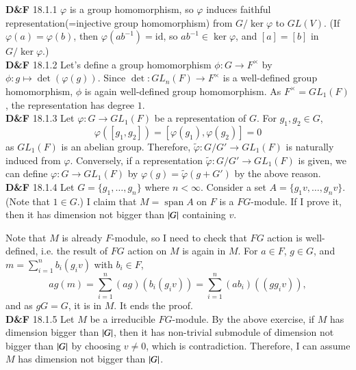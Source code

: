 \documentclass[a4paper, 12pt]{article}
\theoremstyle{Mydefinition}
\theoremstyle{Mytheorem}
\DeclareMathOperator{\spn}{span}
\begin{document}
\noindent \textbf{D\&F} 18.1.1
$\varphi$ is a group homomorphism, so $\varphi$ induces faithful representation(=injective group homomorphism) from $G/\ker\varphi$ to $GL(V)$. (If $\varphi(a)=\varphi(b)$, then $\varphi(ab^{-1}) = \mathrm{id}$, so $ab^{-1}\in \ker\varphi$, and $[a]=[b]$ in $G/\ker\varphi$.)\\

\noindent \textbf{D\&F} 18.1.2
Let's define a group homomorphism $\phi:G\rightarrow F^\times$ by $\phi:g\mapsto \det(\varphi(g))$. Since $\det:GL_n(F)\rightarrow F^\times$ is a well-defined group homomorphism, $\phi$ is again well-defined group homomorphism. As $F^\times = GL_1(F)$, the representation has degree $1$.\\

\noindent \textbf{D\&F} 18.1.3
Let $\varphi:G\rightarrow GL_1(F)$ be a representation of $G$. For $g_1,g_2\in G$,
\begin{equation}
    \varphi([g_1,g_2]) = [\varphi(g_1),\varphi(g_2)] = 0
\end{equation}
as $GL_1(F)$ is an abelian group. Therefore, $\tilde{\varphi}:G/G'\rightarrow GL_1(F)$ is naturally induced from $\varphi$. Conversely, if a representation $\tilde{\varphi}:G/G'\rightarrow GL_1(F)$ is given, we can define $\varphi:G\rightarrow GL_1(F)$ by $\varphi(g) = \tilde{\varphi}(g+G')$ by the above reason.\\

\noindent \textbf{D\&F} 18.1.4
Let $G=\{g_1, \ldots, g_n\}$ where $n<\infty$. Consider a set $A = \{g_1v, \ldots, g_n v\}$. (Note that $1\in G$.) I claim that $M=\spn A$ on $F$ is a $FG$-module. If I prove it, then it has dimension not bigger than $\abs{G}$ containing $v$.

Note that $M$ is already $F$-module, so I need to check that $FG$ action is well-defined, i.e. the result of $FG$ action on $M$ is again in $M$. For $a\in F$, $g\in G$, and $m = \sum_{i=1}^n b_i(g_iv)$ with $b_i\in F$,
\begin{equation}
    ag(m) = \sum_{i=1}^n (ag)(b_i(g_iv)) = \sum_{i=1}^n (ab_i)((gg_iv)),
\end{equation}
and as $gG = G$, it is in $M$. It ends the proof.\\

\noindent \textbf{D\&F} 18.1.5
Let $M$ be a irreducible $FG$-module. By the above exercise, if $M$ has dimension bigger than $\abs{G}$, then it has non-trivial submodule of dimension not bigger than $\abs{G}$ by choosing $v\neq 0$, which is contradiction. Therefore, I can assume $M$ has dimension not bigger than $\abs{G}$.
\end{document}
